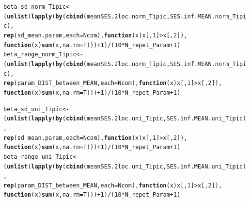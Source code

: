 \documentclass[12pt]{article}\usepackage[]{graphicx}\usepackage[]{color}
\makeatletter
\newcommand{\hlnum}[1]{\textcolor[rgb]{0.686,0.059,0.569}{#1}}%
\newcommand{\hlopt}[1]{\textcolor[rgb]{0,0,0}{#1}}%
\newcommand{\hlstd}[1]{\textcolor[rgb]{0.345,0.345,0.345}{#1}}%
\newcommand{\hlkwa}[1]{\textcolor[rgb]{0.161,0.373,0.58}{\textbf{#1}}}%
\newcommand{\hlkwb}[1]{\textcolor[rgb]{0.69,0.353,0.396}{#1}}%
\newcommand{\hlkwc}[1]{\textcolor[rgb]{0.333,0.667,0.333}{#1}}%
\newcommand{\hlkwd}[1]{\textcolor[rgb]{0.737,0.353,0.396}{\textbf{#1}}}%
\newenvironment{kframe}{%
 \def\at@end@of@kframe{}%
 \ifinner\ifhmode%
  \def\at@end@of@kframe{\end{minipage}}%
  \begin{minipage}{\columnwidth}%
 \fi\fi%
 \def\FrameCommand##1{\hskip\@totalleftmargin \hskip-\fboxsep
 \colorbox{shadecolor}{##1}\hskip-\fboxsep
     \hskip-\linewidth \hskip-\@totalleftmargin \hskip\columnwidth}%
 \MakeFramed {\advance\hsize-\width
   \@totalleftmargin\z@ \linewidth\hsize
   \@setminipage}}%
 {\par\unskip\endMakeFramed%
 \at@end@of@kframe}
\newenvironment{knitrout}{}{} %
\makeatother
\begin{document}
\begin{knitrout}\small
{}\color{fgcolor}\begin{kframe}
\begin{alltt}
\hlstd{beta_sd_norm_Tipic} \hlkwb{<-}
 \hlstd{(}\hlkwd{unlist}\hlstd{(}\hlkwd{lapply}\hlstd{(}\hlkwd{by}\hlstd{(}\hlkwd{cbind}\hlstd{(meanSES.2loc.norm_Tipic, SES.inf.MEAN.norm_Tipic),}
     \hlkwd{rep}\hlstd{(sd_mean.param,} \hlkwc{each} \hlstd{= Ncom),} \hlkwa{function}\hlstd{(}\hlkwc{x}\hlstd{) x[,}\hlnum{1}\hlstd{]} \hlopt{>} \hlstd{x[,}\hlnum{2}\hlstd{]),}
     \hlkwa{function}\hlstd{(}\hlkwc{x}\hlstd{)} \hlkwd{sum}\hlstd{(x,} \hlkwc{na.rm} \hlstd{= T)))}\hlopt{+}\hlnum{1}\hlstd{)}\hlopt{/}\hlstd{(}\hlnum{10} \hlopt{*} \hlstd{N_repet_Param} \hlopt{+} \hlnum{1}\hlstd{)}
\hlstd{beta_range_norm_Tipic} \hlkwb{<-}
 \hlstd{(}\hlkwd{unlist}\hlstd{(}\hlkwd{lapply}\hlstd{(}\hlkwd{by}\hlstd{(}\hlkwd{cbind}\hlstd{(meanSES.2loc.norm_Tipic, SES.inf.MEAN.norm_Tipic),}
     \hlkwd{rep}\hlstd{(param_DIST_between_MEAN,} \hlkwc{each} \hlstd{= Ncom),} \hlkwa{function}\hlstd{(}\hlkwc{x}\hlstd{) x[,}\hlnum{1}\hlstd{]} \hlopt{>} \hlstd{x[,}\hlnum{2}\hlstd{]),}
     \hlkwa{function}\hlstd{(}\hlkwc{x}\hlstd{)} \hlkwd{sum}\hlstd{(x,} \hlkwc{na.rm} \hlstd{= T)))}\hlopt{+}\hlnum{1}\hlstd{)}\hlopt{/}\hlstd{(}\hlnum{10} \hlopt{*} \hlstd{N_repet_Param} \hlopt{+} \hlnum{1}\hlstd{)}

\hlstd{beta_sd_uni_Tipic} \hlkwb{<-}
 \hlstd{(}\hlkwd{unlist}\hlstd{(}\hlkwd{lapply}\hlstd{(}\hlkwd{by}\hlstd{(}\hlkwd{cbind}\hlstd{(meanSES.2loc.uni_Tipic, SES.inf.MEAN.uni_Tipic),}
     \hlkwd{rep}\hlstd{(sd_mean.param,} \hlkwc{each} \hlstd{= Ncom),} \hlkwa{function}\hlstd{(}\hlkwc{x}\hlstd{) x[,}\hlnum{1}\hlstd{]} \hlopt{>} \hlstd{x[,}\hlnum{2}\hlstd{]),}
     \hlkwa{function}\hlstd{(}\hlkwc{x}\hlstd{)} \hlkwd{sum}\hlstd{(x,} \hlkwc{na.rm} \hlstd{= T)))}\hlopt{+}\hlnum{1}\hlstd{)}\hlopt{/}\hlstd{(}\hlnum{10} \hlopt{*} \hlstd{N_repet_Param} \hlopt{+} \hlnum{1}\hlstd{)}
\hlstd{beta_range_uni_Tipic} \hlkwb{<-}
 \hlstd{(}\hlkwd{unlist}\hlstd{(}\hlkwd{lapply}\hlstd{(}\hlkwd{by}\hlstd{(}\hlkwd{cbind}\hlstd{(meanSES.2loc.uni_Tipic, SES.inf.MEAN.uni_Tipic),}
     \hlkwd{rep}\hlstd{(param_DIST_between_MEAN,} \hlkwc{each} \hlstd{= Ncom),} \hlkwa{function}\hlstd{(}\hlkwc{x}\hlstd{) x[,}\hlnum{1}\hlstd{]} \hlopt{>} \hlstd{x[,}\hlnum{2}\hlstd{]),}
     \hlkwa{function}\hlstd{(}\hlkwc{x}\hlstd{)} \hlkwd{sum}\hlstd{(x,} \hlkwc{na.rm} \hlstd{= T)))}\hlopt{+}\hlnum{1}\hlstd{)}\hlopt{/}\hlstd{(}\hlnum{10} \hlopt{*} \hlstd{N_repet_Param} \hlopt{+} \hlnum{1}\hlstd{)}


\end{alltt}
\end{kframe}
\end{knitrout}
\end{document}
